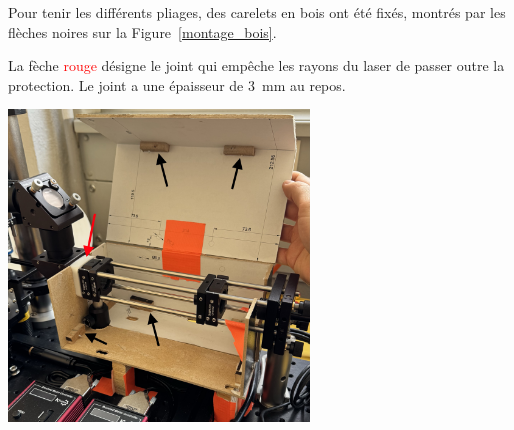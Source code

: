 \begin{minipage}{\textwidth}
    Pour tenir les différents pliages, des carelets en bois ont été fixés, montrés par les flèches noires sur la Figure~\ref{montage_bois}.

    La fèche \textcolor{red}{rouge} désigne le joint qui empêche les rayons du laser de passer outre la protection. Le joint a une épaisseur de 3~mm au repos.
    \vspace{1em}
    \begin{center}
        \includegraphics[width=0.6\textwidth]{assets/figures/Protections_laser/Securite_mecanique/Protection_entree_laser/montage_bois.jpeg}
    \end{center}
    \label{montage_bois}
\end{minipage}
